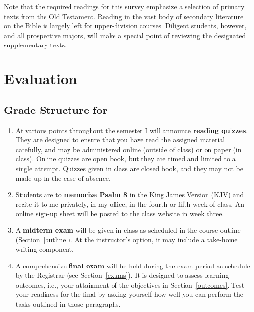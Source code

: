 \documentclass[titlepage]{article}
\begin{document}
Note that the required readings for this survey emphasize a selection of
primary texts from the Old Testament. Reading in the vast body of
secondary literature on the Bible is largely left for upper-division
courses. Diligent students, however, and all prospective majors, will
make a special point of reviewing the designated supplementary texts.

\section{Evaluation}
\label{evaluation}

\subsection{Grade Structure for \ccode}
\label{structure}

\begin{enumerate}

	\item At various points throughout the semester I will announce
	\textbf{reading quizzes}. They are designed to ensure that you have
	read the assigned material carefully, and may be administered online
	(outside of class) or on paper (in class). Online quizzes are open
	book, but they are timed and limited to a single attempt. Quizzes
	given in class are closed book, and they may not be made up in the
	case of absence.

	\item Students are to \textbf{memorize Psalm 8} in the King James
	Version (KJV) and recite it to me privately, in my office, in the
	fourth or fifth week of class. An online sign-up sheet will be
	posted to the class website in week three.

	\item A \textbf{midterm exam} will be given in class as scheduled in
	the course outline (Section~\ref{outline}). At the instructor's
	option, it may include a take-home writing component.

	\item A comprehensive \textbf{final exam} will be held during the
	exam period as schedule by the Registrar (see Section~\ref{exams}).
	It is designed to assess learning outcomes, i.e., your attainment of
	the objectives in Section~\ref{outcomes}. Test your readiness for
	the final by asking yourself how well you can perform the tasks
	outlined in those paragraphs.

\end{enumerate}
\end{document}
